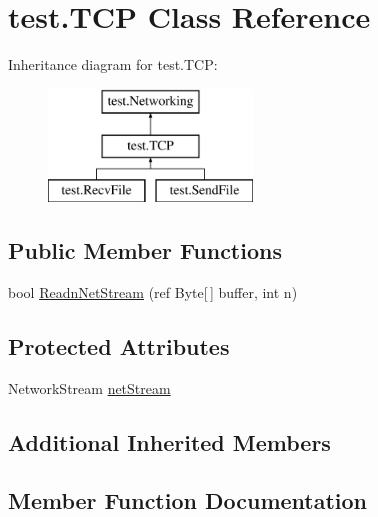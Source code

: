 \hypertarget{classtest_1_1_t_c_p}{}\section{test.\+T\+CP Class Reference}
\label{classtest_1_1_t_c_p}
Inheritance diagram for test.\+T\+CP\+:\begin{figure}[H]
\begin{center}
\leavevmode
\includegraphics[height=3.000000cm]{classtest_1_1_t_c_p}
\end{center}
\end{figure}
\subsection*{Public Member Functions}
\begin{DoxyCompactItemize}
\item 
bool \hyperlink{classtest_1_1_t_c_p_ad6ea78c544fbf5861fce792f8fed63b3}{Readn\+Net\+Stream} (ref Byte\mbox{[}$\,$\mbox{]} buffer, int n)
\end{DoxyCompactItemize}
\subsection*{Protected Attributes}
\begin{DoxyCompactItemize}
\item 
Network\+Stream \hyperlink{classtest_1_1_t_c_p_adbaa960d60637651d5fe2b67aba975d7}{net\+Stream}
\end{DoxyCompactItemize}
\subsection*{Additional Inherited Members}


\subsection{Member Function Documentation}
\mbox{\label{classtest_1_1_t_c_p_ad6ea78c544fbf5861fce792f8fed63b3}} 

